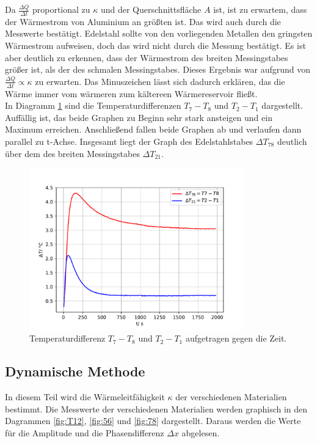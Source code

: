 Da $\frac{\Delta Q}{\Delta t}$ proportional zu $\kappa$ und der Querschnittsfläche $A$ ist,
ist zu erwartem, dass der Wärmestrom von Aluminium an größten ist. Das wird auch durch die Messwerte bestätigt.
Edelstahl sollte von den vorliegenden Metallen den gringsten Wärmestrom aufweisen, doch das wird
nicht durch die Messung  bestätigt. Es ist aber deutlich zu erkennen, dass der Wärmestrom des breiten
Messingstabes größer ist, als der des schmalen Messingstabes. Dieses Ergebnis war aufgrund von
$\frac{\Delta Q}{\Delta t} \propto \kappa$ zu erwarten.
Das Minuszeichen lässt sich dadurch erklären, das die Wärme immer vom wärmeren zum
kältereen Wärmereservoir fließt.
\\
In Diagramm \ref{fig:diff} sind die Temperaturdifferenzen $T_{7}-T_{8}$ und $T_{2}-T_{1}$
dargestellt. Auffällig ist, das beide Graphen zu Beginn sehr stark ansteigen und ein
Maximum erreichen. Anschließend fallen beide Graphen ab und verlaufen dann parallel zu t-Achse.
Insgesamt liegt der Graph des Edelstahlstabes $\Delta T_{78}$ deutlich über dem des breiten
Messingstabes $\Delta T_{21}$.
\begin{figure}[H]
  \centering
  \includegraphics[height=7cm]{T7821.pdf}
  \caption{Temperaturdifferenz $T_{7}-T_{8}$ und $T_{2}-T_{1}$ aufgetragen gegen die Zeit.}
  \label{fig:diff}
\end{figure}

\subsection{Dynamische Methode}
In diesem Teil wird die Wärmeleitfähigkeit $\kappa$ der verschiedenen Materialien bestimmt.
Die Messwerte der verschiedenen Materialien werden graphisch in
den Dagrammen \ref{fig:T12}, \ref{fig:56} und \ref{fig:78} dargestellt. Daraus
werden die Werte für die Amplitude und die Phasendifferenz $\Delta x$ abgelesen.

